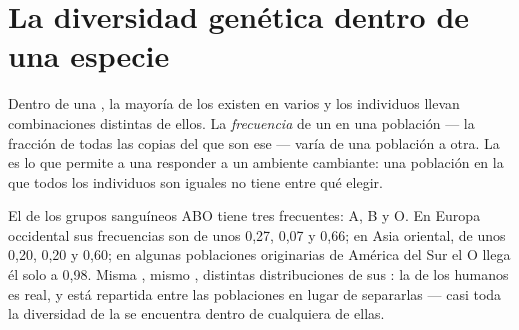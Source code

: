 \section{La diversidad genética dentro de una especie}

\begin{proposition}\label{prop:g10:biodiversity-scales:genetic}
Dentro de una , la mayoría de los  existen en varios 
y los individuos llevan combinaciones distintas de ellos. La
\emph{frecuencia} de un  en una población --- la fracción de todas
las copias del  que son ese  --- varía de una población a otra.
La  es lo que permite a una  responder a un
ambiente cambiante: una población en la que todos los individuos son
iguales no tiene entre qué elegir.
\end{proposition}
\admitted

\begin{example}\label{ex:g10:biodiversity-scales:abo}
El  de los grupos sanguíneos ABO tiene tres  frecuentes: A, B
y O. En Europa occidental sus frecuencias son de unos 0,27, 0,07 y
0,66; en Asia oriental, de unos 0,20, 0,20 y 0,60; en algunas
poblaciones originarias de América del Sur el  O llega él solo a
0,98. Misma , mismo , distintas distribuciones de sus :
la  de los humanos es real, y está repartida entre
las poblaciones en lugar de separarlas --- casi toda la diversidad de
la  se encuentra dentro de cualquiera de ellas.
\end{example}

